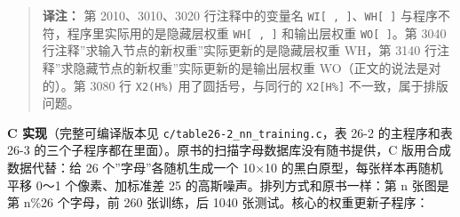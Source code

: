 \begin{Shaded}
\begin{Highlighting}[]
\NormalTok{3030 \textquotesingle{}}
\NormalTok{3130 \textquotesingle{}}
\NormalTok{3200 \textquotesingle{}}
\end{Highlighting}
\end{Shaded}

\begin{quote}
\textbf{译注：} 第 2010、3010、3020 行注释中的变量名
\texttt{WI{[}\ ,\ {]}}、\texttt{WH{[}\ {]}}
与程序不符，程序里实际用的是隐藏层权重 \texttt{WH{[}\ ,\ {]}}
和输出层权重 \texttt{WO{[}\ {]}}。第 3040
行注释''求输入节点的新权重''实际更新的是隐藏层权重 WH，第 3140
行注释''求隐藏节点的新权重''实际更新的是输出层权重
WO（正文的说法是对的）。第 3080 行 \texttt{X2(H\%)} 用了圆括号，与同行的
\texttt{X2{[}H\%{]}} 不一致，属于排版问题。
\end{quote}

\textbf{C 实现}（完整可编译版本见
\texttt{c/table26-2\_nn\_training.c}，表 26-2 的主程序和表 26-3
的三个子程序都在里面）。原书的扫描字母数据库没有随书提供，C
版用合成数据代替：给 26 个''字母''各随机生成一个 10×10
的黑白原型，每张样本再随机平移 0～1 个像素、加标准差 25
的高斯噪声。排列方式和原书一样：第 n 张图是第 n\%26 个字母，前 260
张训练，后 1040 张测试。核心的权重更新子程序：

